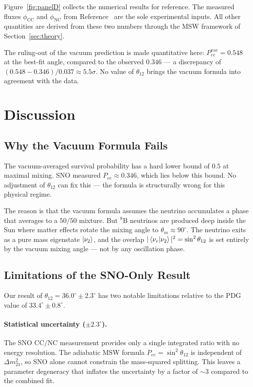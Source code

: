 \documentclass[12pt, a4paper]{article}
\begin{document}
Figure~\ref{fig:panelD} collects the numerical results for reference.
The measured fluxes $\phi_\text{CC}$ and $\phi_\text{NC}$ from
Reference~\cite{SNO2002} are the sole experimental inputs.
All other quantities are derived from these two numbers through the MSW
framework of Section~\ref{sec:theory}.
 
The ruling-out of the vacuum prediction is made quantitative here:
$P_{ee}^{\text{vac}} = 0.548$ at the best-fit angle, compared to the
observed $0.346$ --- a discrepancy of
$(0.548 - 0.346)/0.037 \approx 5.5\sigma$.
No value of $\theta_{12}$ brings the vacuum formula into agreement
with the data.
 
\section{Discussion}
\label{sec:discussion}
 
\subsection{Why the Vacuum Formula Fails}
 
The vacuum-averaged survival probability has a hard lower bound of $0.5$
at maximal mixing.
SNO measured $P_{ee} \approx 0.346$, which lies below this bound.
No adjustment of $\theta_{12}$ can fix this --- the formula is
structurally wrong for this physical regime.
 
The reason is that the vacuum formula assumes the neutrino accumulates
a phase that averages to a $50/50$ mixture.
But ${}^8\text{B}$ neutrinos are produced deep inside the Sun where
matter effects rotate the mixing angle to $\theta_m \approx 90^\circ$.
The neutrino exits as a pure mass eigenstate $\ket{\nu_2}$, and the
overlap $|\braket{\nu_e}{\nu_2}|^2 = \sin^2\theta_{12}$ is set entirely
by the vacuum mixing angle --- not by any oscillation phase.
 
\subsection{Limitations of the SNO-Only Result}
 
Our result of $\theta_{12} = 36.0^\circ \pm 2.3^\circ$ has two notable
limitations relative to the PDG value of $33.4^\circ \pm 0.8^\circ$.
 
\paragraph{Statistical uncertainty ($\pm 2.3^\circ$).}
The SNO CC/NC measurement provides only a single integrated ratio with
no energy resolution.
The adiabatic MSW formula $P_{ee} = \sin^2\theta_{12}$ is independent
of $\Delta m^2_{21}$, so SNO alone cannot constrain the mass-squared
splitting.
This leaves a parameter degeneracy that inflates the uncertainty by
a factor of $\sim\!3$ compared to the combined fit.
 
\end{document}
